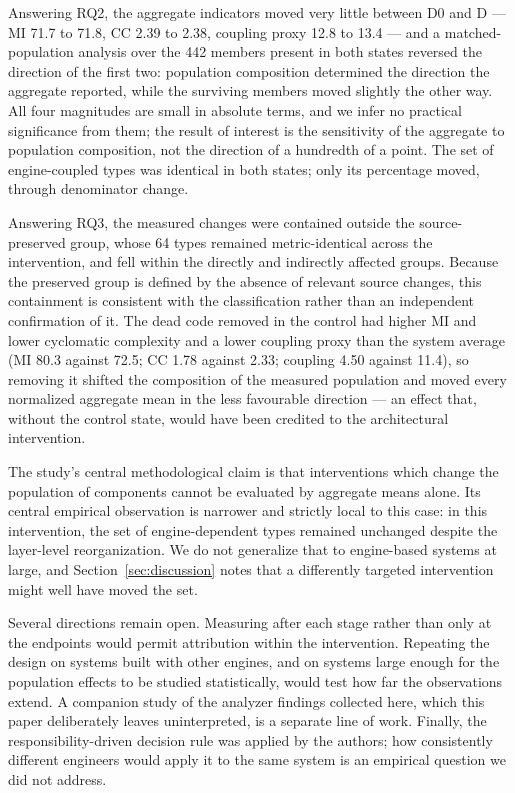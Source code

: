 \documentclass[pdflatex,sn-basic]{sn-jnl}
\begin{document}
Answering RQ2, the aggregate indicators moved very little between D0 and D --- MI 71.7 to 71.8, CC 2.39 to 2.38, coupling proxy 12.8 to 13.4 --- and a matched-population analysis over the 442 members present in both states reversed the direction of the first two: population composition determined the direction the aggregate reported, while the surviving members moved slightly the other way. All four magnitudes are small in absolute terms, and we infer no practical significance from them; the result of interest is the sensitivity of the aggregate to population composition, not the direction of a hundredth of a point. The set of engine-coupled types was identical in both states; only its percentage moved, through denominator change.

Answering RQ3, the measured changes were contained outside the source-preserved group, whose 64 types remained metric-identical across the intervention, and fell within the directly and indirectly affected groups. Because the preserved group is defined by the absence of relevant source changes, this containment is consistent with the classification rather than an independent confirmation of it. The dead code removed in the control had higher MI and lower cyclomatic complexity and a lower coupling proxy than the system average (MI 80.3 against 72.5; CC 1.78 against 2.33; coupling 4.50 against 11.4), so removing it shifted the composition of the measured population and moved every normalized aggregate mean in the less favourable direction --- an effect that, without the control state, would have been credited to the architectural intervention.

The study's central methodological claim is that interventions which change the population of components cannot be evaluated by aggregate means alone. Its central empirical observation is narrower and strictly local to this case: in this intervention, the set of engine-dependent types remained unchanged despite the layer-level reorganization. We do not generalize that to engine-based systems at large, and Section~\ref{sec:discussion} notes that a differently targeted intervention might well have moved the set.

Several directions remain open. Measuring after each stage rather than only at the endpoints would permit attribution within the intervention. Repeating the design on systems built with other engines, and on systems large enough for the population effects to be studied statistically, would test how far the observations extend. A companion study of the analyzer findings collected here, which this paper deliberately leaves uninterpreted, is a separate line of work. Finally, the responsibility-driven decision rule was applied by the authors; how consistently different engineers would apply it to the same system is an empirical question we did not address.
\end{document}
